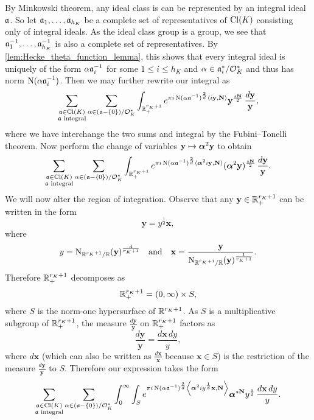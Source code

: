        By Minkowski theorem, any ideal class is can be represented by an integral ideal $\mathfrak{a}$. So let $\mathfrak{a}_{1},\ldots,\mathfrak{a}_{h_{K}}$ be a complete set of representatives of $\operatorname{\mathrm{Cl}}(K)$ consisting only of integral ideals. As the ideal class group is a group, we see that $\mathfrak{a}_{1}^{-1},\ldots,\mathfrak{a}_{h_{K}}^{-1}$ is also a complete set of representatives. By \cref{lem:Hecke_theta_function_lemma}, this shows that every integral ideal is uniquely of the form $\alpha\mathfrak{a}_{i}^{-1}$ for some $1 \le i \le h_{K}$ and $\alpha \in \mathfrak{a}_{i}^{\ast}/\mathcal{O}_{K}^{\ast}$ and thus has norm $\operatorname{\mathrm{N}}(\alpha\mathfrak{a}_{i}^{-1})$. Then we may further rewrite our integral as
      \[
        \sum_{\substack{\mathfrak{a} \in \operatorname{\mathrm{Cl}}(K) \\ \text{$\mathfrak{a}$ integral}}}\sum_{\alpha \in (\mathfrak{a}-\{0\})/\mathcal{O}_{K}^{\ast}}\int_{\mathbb{R}_{+}^{r_{K}+1}}e^{\pi i\operatorname{\mathrm{N}}(\alpha\mathfrak{a}^{-1})^{\frac{2}{d}}\langle i\mathbf{y},\mathbf{N}\rangle}\mathbf{y}^{\frac{s\mathbf{N}}{2}}\,\frac{d\mathbf{y}}{\mathbf{y}},
      \]
      where we have interchange the two sums and integral by the Fubini–Tonelli theorem. Now perform the change of variables $\mathbf{y} \mapsto \boldsymbol{\alpha}^{2}\mathbf{y}$ to obtain
      \[
        \sum_{\substack{\mathfrak{a} \in \operatorname{\mathrm{Cl}}(K) \\ \text{$\mathfrak{a}$ integral}}}\sum_{\alpha \in (\mathfrak{a}-\{0\})/\mathcal{O}_{K}^{\ast}}\int_{\mathbb{R}_{+}^{r_{K}+1}}e^{\pi i\operatorname{\mathrm{N}}(\alpha\mathfrak{a}^{-1})^{\frac{2}{d}}\langle\boldsymbol{\alpha}^{2}i\mathbf{y},\mathbf{N}\rangle}(\boldsymbol{\alpha}^{2}\mathbf{y})^{\frac{s\mathbf{N}}{2}}\,\frac{d\mathbf{y}}{\mathbf{y}}.
      \]
      We will now alter the region of integration. Observe that any $\mathbf{y} \in \mathbb{R}_{+}^{r_{K}+1}$ can be written in the form
      \[
        \mathbf{y} = y^{\frac{1}{d}}\mathbf{x},
      \]
      where
      \[
        y = \operatorname{\mathrm{N}}_{\mathbb{R}^{r_{K}+1}/\mathbb{R}}(\mathbf{y})^{\frac{d}{r_{K}+1}} \quad \text{and} \quad \mathbf{x} = \frac{\mathbf{y}}{\operatorname{\mathrm{N}}_{\mathbb{R}^{r_{K}+1}/\mathbb{R}}(\mathbf{y})^{\frac{1}{r_{K}+1}}}.
      \]
      Therefore $\mathbb{R}_{+}^{r_{K}+1}$ decomposes as
      \[
        \mathbb{R}_{+}^{r_{K}+1} = (0,\infty) \times S,
      \]
      where $S$ is the norm-one hypersurface of $\mathbb{R}^{r_{K}+1}$. As $S$ is a multiplicative subgroup of $\mathbb{R}_{+}^{r_{K}+1}$, the measure $\frac{d\mathbf{y}}{\mathbf{y}}$ on $\mathbb{R}_{+}^{r_{K}+1}$ factors as
      \[
        \frac{d\mathbf{y}}{\mathbf{y}} = \frac{d\mathbf{x}\,dy}{y},
      \]
      where $d\mathbf{x}$ (which can also be written as $\frac{d\mathbf{x}}{\mathbf{x}}$ because $\mathbf{x} \in S$) is the restriction of the measure $\frac{d\mathbf{y}}{\mathbf{y}}$ to $S$. Therefore our expression takes the form
      \[
        \sum_{\substack{\mathfrak{a} \in \operatorname{\mathrm{Cl}}(K) \\ \text{$\mathfrak{a}$ integral}}}\sum_{\alpha \in (\mathfrak{a}-\{0\})/\mathcal{O}_{K}^{\ast}}\int_{0}^{\infty}\int_{S}e^{\pi i\operatorname{\mathrm{N}}(\alpha\mathfrak{a}^{-1})^{\frac{2}{d}}\left\langle\boldsymbol{\alpha}^{2}iy^{\frac{1}{d}}\mathbf{x},\mathbf{N}\right\rangle}\boldsymbol{\alpha}^{s\mathbf{N}}y^{\frac{s}{2}}\,\frac{d\mathbf{x}\,dy}{y}.
      \]
